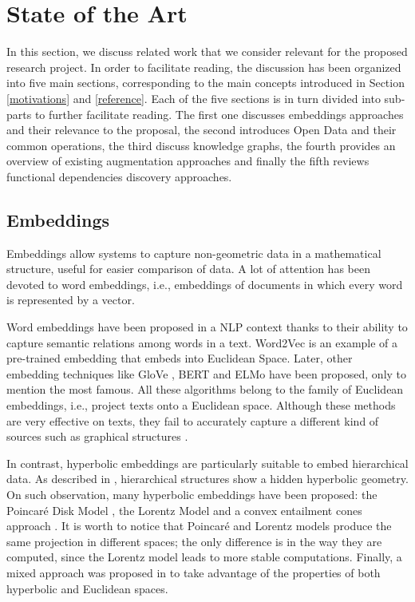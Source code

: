 \section{State of the Art}\label{related}
In this section, we discuss related work that we consider relevant for the proposed research project. In order to facilitate reading, the discussion has been organized into five main sections, corresponding to the main concepts introduced in Section \ref{motivations} and \ref{reference}. Each of the five sections is in turn divided into sub-parts to further facilitate reading. The first one discusses embeddings approaches and their relevance to the proposal, the second introduces Open Data and their common operations, the third discuss knowledge graphs, the fourth provides an overview of existing augmentation approaches and finally the fifth reviews functional dependencies discovery approaches.

\subsection{Embeddings}
Embeddings allow systems to capture non-geometric data in a mathematical structure, useful for easier comparison of data. A lot of attention has been devoted to word embeddings, i.e., embeddings of documents in which every word is represented by a vector. 

Word embeddings have been proposed in a NLP context thanks to their ability to capture semantic relations among words in a text. 
Word2Vec \cite{Mikolov2013EfficientEO} is an example of a pre-trained embedding that embeds into Euclidean Space. 
Later, other embedding techniques like GloVe \cite{pennington2014glove}, BERT \cite{devlin2018bert} and ELMo \cite{peters2018deep} have been proposed, only to mention the most famous. 
All these algorithms belong to the family of Euclidean embeddings, i.e., project texts onto a Euclidean space. 
Although these methods are very effective on texts, they fail to accurately capture a different kind of sources such as graphical structures \cite{NIPS2017_7213}. 

In contrast, hyperbolic embeddings are particularly suitable to embed hierarchical data. 
As described in \cite{krioukov2010hyperbolic}, hierarchical structures show a hidden hyperbolic geometry. 
On such observation, many hyperbolic embeddings have been proposed: the Poincar\'e Disk Model \cite{NIPS2017_7213}, the Lorentz Model \cite{DBLP:journals/corr/abs-1806-03417} and a convex entailment cones approach \cite{ganea2018hyperbolic}. 
It is worth to notice that Poincar\'e and Lorentz models produce the same projection in different spaces; the only difference is in the way they are computed, since the Lorentz model leads to more stable computations. 
Finally, a mixed approach was proposed in \cite{gu2018learning} to take advantage of the properties of both hyperbolic and Euclidean spaces. 

